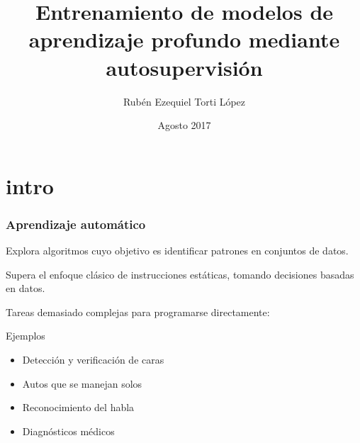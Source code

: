 \documentclass{beamer}
\title{Entrenamiento de modelos de aprendizaje profundo mediante autosupervisión}
\author
{Rubén Ezequiel Torti López}
\institute
{
  Facultad de Matemática, Astronomía, Física y Computación\\
  Universidad Nacional de Córdoba
}
\date
{Agosto 2017}
\begin{document}
\frame{\titlepage}




\section{intro}
\begin{frame}[plain]
\frametitle{Aprendizaje automático}
Explora algoritmos cuyo objetivo es identificar patrones en conjuntos de datos.\pause
\vfill

Supera el enfoque clásico de instrucciones estáticas, tomando decisiones basadas en datos.\pause
\vfill

Tareas demasiado complejas para programarse directamente:
\vfill
\begin{block}{Ejemplos}
\begin{itemize}
    \item Detección y verificación de caras
    \item Autos que se manejan solos 
    \item Reconocimiento del habla
    \item Diagnósticos médicos 
\end{itemize}
\end{block}
\end{frame}
\end{document}
